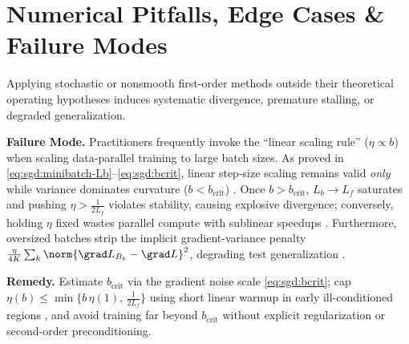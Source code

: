 \documentclass[../../../../master.tex]{subfiles}
\begin{document}
\clearpage
\section{Numerical Pitfalls, Edge Cases \& Failure Modes}
\label{sec:sgd:pitfalls}

Applying stochastic or nonsmooth first-order methods outside their theoretical operating hypotheses induces systematic divergence, premature stalling, or degraded generalization.

\begin{pitfall}
\textbf{Failure Mode.} Practitioners frequently invoke the ``linear scaling rule'' ($\eta \propto b$) when scaling data-parallel training to large batch sizes. As proved in \eqref{eq:sgd:minibatch-Lb}--\eqref{eq:sgd:bcrit}, linear step-size scaling remains valid \emph{only} while variance dominates curvature ($b < b_{\mathrm{crit}}$) . Once $b > b_{\mathrm{crit}}$, $L_b \to L_f$ saturates and pushing $\eta > \frac{1}{2L_f}$ violates stability, causing explosive divergence; conversely, holding $\eta$ fixed wastes parallel compute with sublinear speedups . Furthermore, oversized batches strip the implicit gradient-variance penalty $\frac{\eta}{4K}\sum_{k}\norm{\grad L_{B_k} - \grad L}^2$, degrading test generalization .

\textbf{Remedy.} Estimate $b_{\mathrm{crit}}$ via the gradient noise scale \eqref{eq:sgd:bcrit}; cap $\eta(b) \le \min\bigl\{b\,\eta(1),\, \frac{1}{2L_f}\bigr\}$ using short linear warmup in early ill-conditioned regions , and avoid training far beyond $b_{\mathrm{crit}}$ without explicit regularization or second-order preconditioning.
\end{pitfall}
\end{document}
